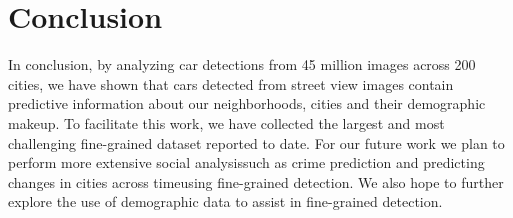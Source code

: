 \documentclass[10pt,twocolumn,letterpaper]{article}
\begin{document}
\section{Conclusion}
In conclusion, by analyzing car detections from 45 million images across 200 cities, we have shown that cars detected from street view images contain predictive information about our neighborhoods, cities and their demographic makeup. To facilitate this work, we have collected the largest and most challenging fine-grained dataset reported to date. For our future work we plan to perform more extensive social analysis\textemdash such as crime prediction and predicting changes in cities across time\textemdash using fine-grained detection. We also hope to further explore the use of demographic data to assist in fine-grained detection. 
{\small


}
\end{document}
